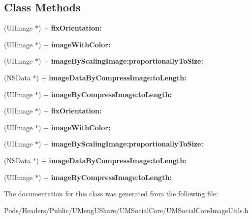 \subsection*{Class Methods}
\begin{DoxyCompactItemize}
\item 
\mbox{\label{interface_u_m_social_core_image_utils_acf2d837f516733baffe4a83824745d86}} 
(U\+I\+Image $\ast$) + {\bfseries fix\+Orientation\+:}
\item 
\mbox{\label{interface_u_m_social_core_image_utils_a6382ced023d904f47d1cd2bbb203ea43}} 
(U\+I\+Image $\ast$) + {\bfseries image\+With\+Color\+:}
\item 
\mbox{\label{interface_u_m_social_core_image_utils_a261b0db558c77fff5c977032610a8b0d}} 
(U\+I\+Image $\ast$) + {\bfseries image\+By\+Scaling\+Image\+:proportionally\+To\+Size\+:}
\item 
\mbox{\label{interface_u_m_social_core_image_utils_aa6c2d1dad71cad5a670f65720e55a1b4}} 
(N\+S\+Data $\ast$) + {\bfseries image\+Data\+By\+Compress\+Image\+:to\+Length\+:}
\item 
\mbox{\label{interface_u_m_social_core_image_utils_af6311528fc4a5fbc4f6ad2ca3f72f672}} 
(U\+I\+Image $\ast$) + {\bfseries image\+By\+Compress\+Image\+:to\+Length\+:}
\item 
\mbox{\label{interface_u_m_social_core_image_utils_acf2d837f516733baffe4a83824745d86}} 
(U\+I\+Image $\ast$) + {\bfseries fix\+Orientation\+:}
\item 
\mbox{\label{interface_u_m_social_core_image_utils_a6382ced023d904f47d1cd2bbb203ea43}} 
(U\+I\+Image $\ast$) + {\bfseries image\+With\+Color\+:}
\item 
\mbox{\label{interface_u_m_social_core_image_utils_a261b0db558c77fff5c977032610a8b0d}} 
(U\+I\+Image $\ast$) + {\bfseries image\+By\+Scaling\+Image\+:proportionally\+To\+Size\+:}
\item 
\mbox{\label{interface_u_m_social_core_image_utils_aa6c2d1dad71cad5a670f65720e55a1b4}} 
(N\+S\+Data $\ast$) + {\bfseries image\+Data\+By\+Compress\+Image\+:to\+Length\+:}
\item 
\mbox{\label{interface_u_m_social_core_image_utils_af6311528fc4a5fbc4f6ad2ca3f72f672}} 
(U\+I\+Image $\ast$) + {\bfseries image\+By\+Compress\+Image\+:to\+Length\+:}
\end{DoxyCompactItemize}


The documentation for this class was generated from the following file\+:\begin{DoxyCompactItemize}
\item 
Pods/\+Headers/\+Public/\+U\+Meng\+U\+Share/\+U\+M\+Social\+Core/U\+M\+Social\+Core\+Image\+Utils.\+h\end{DoxyCompactItemize}
